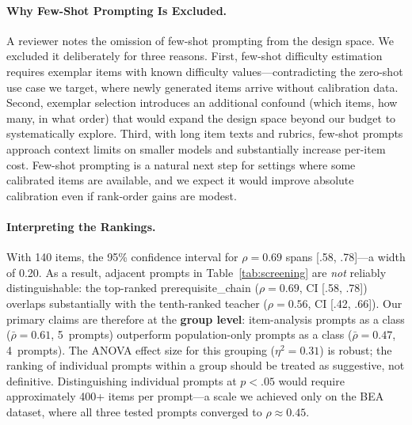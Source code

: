 

\paragraph{Why Few-Shot Prompting Is Excluded.}
A reviewer notes the omission of few-shot prompting from the design space. We excluded it deliberately for three reasons. First, few-shot difficulty estimation requires exemplar items with known difficulty values---contradicting the zero-shot use case we target, where newly generated items arrive without calibration data. Second, exemplar selection introduces an additional confound (which items, how many, in what order) that would expand the design space beyond our budget to systematically explore. Third, with long item texts and rubrics, few-shot prompts approach context limits on smaller models and substantially increase per-item cost. Few-shot prompting is a natural next step for settings where some calibrated items are available, and we expect it would improve absolute calibration even if rank-order gains are modest.


\paragraph{Interpreting the Rankings.}
With 140 items, the 95\% confidence interval for $\rho = 0.69$ spans [.58, .78]---a width of 0.20. As a result, adjacent prompts in Table~\ref{tab:screening} are \emph{not} reliably distinguishable: the top-ranked prerequisite\_chain ($\rho = 0.69$, CI [.58, .78]) overlaps substantially with the tenth-ranked teacher ($\rho = 0.56$, CI [.42, .66]). Our primary claims are therefore at the \textbf{group level}: item-analysis prompts as a class ($\bar{\rho} = 0.61$, 5~prompts) outperform population-only prompts as a class ($\bar{\rho} = 0.47$, 4~prompts). The ANOVA effect size for this grouping ($\eta^2 = 0.31$) is robust; the ranking of individual prompts within a group should be treated as suggestive, not definitive. Distinguishing individual prompts at $p < .05$ would require approximately 400+ items per prompt---a scale we achieved only on the BEA dataset, where all three tested prompts converged to $\rho \approx 0.45$.
